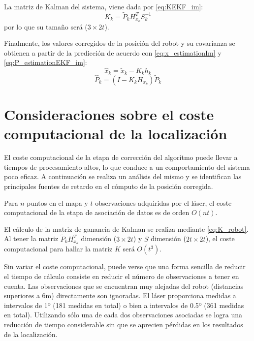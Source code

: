La matriz de Kalman del sistema, viene dada por \ref{eq:KEKF_im}:
\begin{equation}\label{eq:K_robot}
    K_{k} = \tilde{P}_{k}H_{x_{k}}^{T}S_{k}^{-1}
\end{equation}
por lo que su tamaño será ($3 \times 2t$).

Finalmente, los valores corregidos de la posición del robot y su covarianza se obtienen a partir de la predicción de acuerdo con \ref{eq:x_estimationIm} y \ref{eq:P_estimationEKF_im}:
\begin{equation}\label{eq:x_robot}
    \hat{x}_{k} = \tilde{x}_{k} - K_{k}h_{k}
\end{equation}
\begin{equation}\label{eq:P_robot}
    \hat{P}_{k} = (I-K_{k}H_{x_{k}})\tilde{P}_{k}
\end{equation}


\section{Consideraciones sobre el coste \\ computacional de la localización} \label{computacional}

El coste computacional de la etapa de corrección del algoritmo puede llevar a tiempos de procesamiento altos, lo que conduce a un comportamiento del sistema poco eficaz. A continuación se realiza un análisis del mismo y se identifican las principales fuentes de retardo en el cómputo de la posición corregida.

Para $n$ puntos en el mapa y $t$ observaciones adquiridas por el láser, el coste computacional de la etapa de asociación de datos es de orden $O(nt)$.

El cálculo de la matriz de ganancia de Kalman se realiza mediante \ref{eq:K_robot}. Al tener la matriz $\tilde{P}_{k}H_{x_{k}}^{T}$ dimensión ($3 \times 2t$) y $S$ dimensión ($2t \times 2t$), el coste computacional para hallar la matriz $K$ será $O(t^{3})$.

Sin variar el coste computacional, puede verse que una forma sencilla de reducir el tiempo de cálculo consiste en reducir el número de observaciones a tener en cuenta. Las observaciones que se encuentran muy alejadas del robot (distancias superiores a 6m) directamente son ignoradas. El láser proporciona medidas a intervalos de 1º (181 medidas en total) o bien a intervalos de 0.5º (361 medidas en total). Utilizando sólo una de cada dos observaciones asociadas se logra una reducción de tiempo considerable sin que se aprecien pérdidas en los resultados de la localización.

